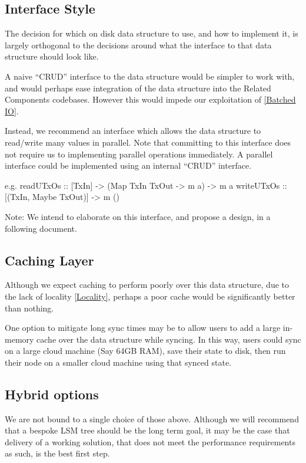 \documentclass[11pt,a4paper]{article}
\begin{document}
\subsection{Interface Style}

The decision for which on disk data structure to use, and how to implement it,
is largely orthogonal to the decisions around what the interface to that data
structure should look like.

A naive ``CRUD'' interface to the data structure would be simpler to work with,
and would perhaps ease integration of the data structure into the Related Components
codebases. However this would impede our exploitation of \ref{Batched IO}.

Instead, we recommend an interface which allows the data structure to read/write
many values in parallel. Note that committing to this interface does not require
us to implementing parallel operations immediately. A parallel interface could
be implemented using an internal ``CRUD'' interface.

e.g.
readUTxOs :: [TxIn] -> (Map TxIn TxOut -> m a) -> m a
writeUTxOs :: [(TxIn, Maybe TxOut)] -> m ()


Note: We intend to elaborate on this interface, and propose a design, in a
following document.

\subsection{Caching Layer}
\label{Caching Layer}

Although we expect caching to perform poorly over this data structure, due to the
lack of locality \ref{Locality}, perhaps a poor cache would be significantly
better than nothing.

One option to mitigate long sync times may be to allow users to add a large
in-memory cache over the data structure while syncing. In this way, users could
sync on a large cloud machine (Say 64GB RAM), save their state to disk, then run
their node on a smaller cloud machine using that synced state.


\subsection{Hybrid options}

We are not bound to a single choice of those above. Although we will recommend that
a bespoke LSM tree should be the long term goal, it may be the case that delivery of a
working solution, that does not meet the performance requirements as such, is
the best first step.
\end{document}
